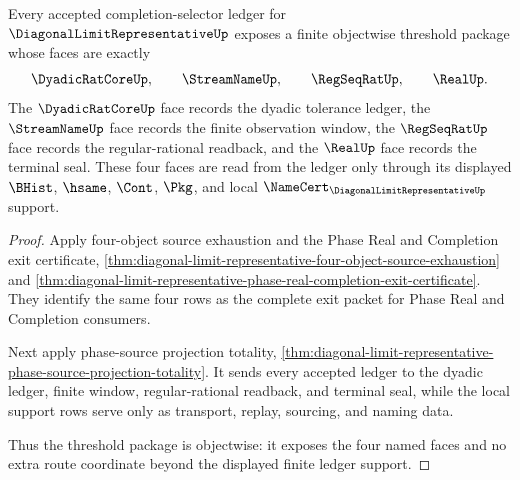 \begin{theorem}
\label{thm:diagonal-limit-representative-face-threshold-readiness}
Every accepted completion-selector ledger for $\DiagonalLimitRepresentativeUp$ exposes a finite objectwise threshold package whose faces are exactly
$$
\DyadicRatCoreUp,\qquad \StreamNameUp,\qquad \RegSeqRatUp,\qquad \RealUp.
$$
The $\DyadicRatCoreUp$ face records the dyadic tolerance ledger, the $\StreamNameUp$ face records the finite observation window, the $\RegSeqRatUp$ face records the regular-rational readback, and the $\RealUp$ face records the terminal seal. These four faces are read from the ledger only through its displayed $\BHist$, $\hsame$, $\Cont$, $\Pkg$, and local $\NameCert_{\DiagonalLimitRepresentativeUp}$ support.
\end{theorem}
\begin{proof}
Apply four-object source exhaustion and the Phase Real and Completion exit certificate, \autoref{thm:diagonal-limit-representative-four-object-source-exhaustion} and \autoref{thm:diagonal-limit-representative-phase-real-completion-exit-certificate}. They identify the same four rows as the complete exit packet for Phase Real and Completion consumers.

Next apply phase-source projection totality, \autoref{thm:diagonal-limit-representative-phase-source-projection-totality}. It sends every accepted ledger to the dyadic ledger, finite window, regular-rational readback, and terminal seal, while the local support rows serve only as transport, replay, sourcing, and naming data.

Thus the threshold package is objectwise: it exposes the four named faces and no extra route coordinate beyond the displayed finite ledger support.
\end{proof}


